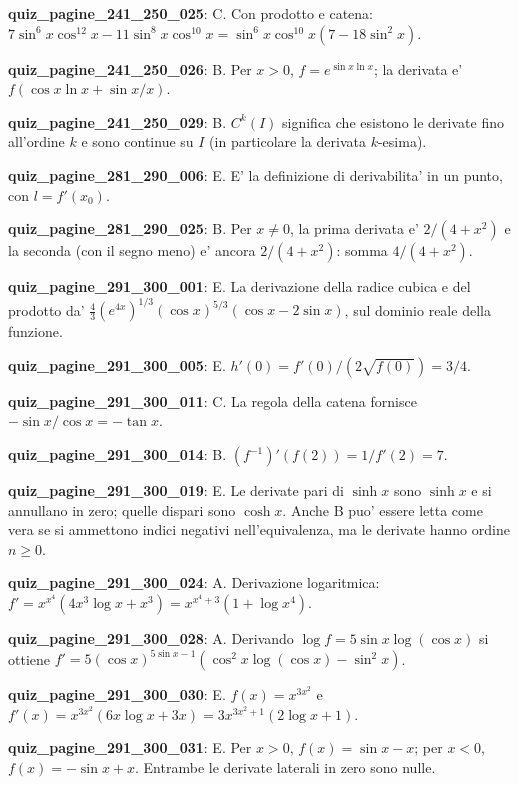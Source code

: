 \documentclass[11pt,a4paper]{article}
\newcounter{quiz}
\begin{document}
\noindent\textbf{quiz\_pagine\_241\_250\_025}: C. Con prodotto e catena: $7\sin^6x\cos^{12}x-11\sin^8x\cos^{10}x=\sin^6x\cos^{10}x(7-18\sin^2x)$.\par\medskip
\noindent\textbf{quiz\_pagine\_241\_250\_026}: B. Per $x>0$, $f=e^{\sin x\ln x}$; la derivata e' $f(\cos x\ln x+\sin x/x)$.\par\medskip
\noindent\textbf{quiz\_pagine\_241\_250\_029}: B. $C^k(I)$ significa che esistono le derivate fino all'ordine $k$ e sono continue su $I$ (in particolare la derivata $k$-esima).\par\medskip
\noindent\textbf{quiz\_pagine\_281\_290\_006}: E. E' la definizione di derivabilita' in un punto, con $l=f'(x_0)$.\par\medskip
\noindent\textbf{quiz\_pagine\_281\_290\_025}: B. Per $x\neq0$, la prima derivata e' $2/(4+x^2)$ e la seconda (con il segno meno) e' ancora $2/(4+x^2)$: somma $4/(4+x^2)$.\par\medskip
\noindent\textbf{quiz\_pagine\_291\_300\_001}: E. La derivazione della radice cubica e del prodotto da' $\frac43(e^{4x})^{1/3}(\cos x)^{5/3}(\cos x-2\sin x)$, sul dominio reale della funzione.\par\medskip
\noindent\textbf{quiz\_pagine\_291\_300\_005}: E. $h'(0)=f'(0)/(2\sqrt{f(0)})=3/4$.\par\medskip
\noindent\textbf{quiz\_pagine\_291\_300\_011}: C. La regola della catena fornisce $-\sin x/\cos x=-\tan x$.\par\medskip
\noindent\textbf{quiz\_pagine\_291\_300\_014}: B. $(f^{-1})'(f(2))=1/f'(2)=7$.\par\medskip
\noindent\textbf{quiz\_pagine\_291\_300\_019}: E. Le derivate pari di $\sinh x$ sono $\sinh x$ e si annullano in zero; quelle dispari sono $\cosh x$. Anche B puo' essere letta come vera se si ammettono indici negativi nell'equivalenza, ma le derivate hanno ordine $n\geq0$.\par\medskip
\noindent\textbf{quiz\_pagine\_291\_300\_024}: A. Derivazione logaritmica: $f'=x^{x^4}(4x^3\log x+x^3)=x^{x^4+3}(1+\log x^4)$.\par\medskip
\noindent\textbf{quiz\_pagine\_291\_300\_028}: A. Derivando $\log f=5\sin x\log(\cos x)$ si ottiene $f'=5(\cos x)^{5\sin x-1}(\cos^2x\log(\cos x)-\sin^2x)$.\par\medskip
\noindent\textbf{quiz\_pagine\_291\_300\_030}: E. $f(x)=x^{3x^2}$ e $f'(x)=x^{3x^2}(6x\log x+3x)=3x^{3x^2+1}(2\log x+1)$.\par\medskip
\noindent\textbf{quiz\_pagine\_291\_300\_031}: E. Per $x>0$, $f(x)=\sin x-x$; per $x<0$, $f(x)=-\sin x+x$. Entrambe le derivate laterali in zero sono nulle.\par\medskip
\end{document}
